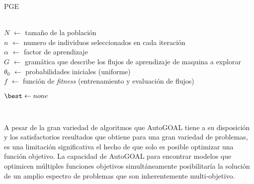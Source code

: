 \begin{algorithm}[htb!]
    \caption{PGE\label{algorithm:pge}}

    \\
    \quad $N$ $\leftarrow$ tamaño de la población \\
    \quad $n$ $\leftarrow$ numero de individuos seleccionados en cada iteración \\
    \quad $\alpha$ $\leftarrow$ factor de aprendizaje \\
    \quad $G$ $\leftarrow$ gramática que describe los flujos de aprendizaje de maquina a explorar \\
    \quad $\theta_0$ $\leftarrow$ probabilidades iniciales (uniforme) \\
    \quad $f$ $\leftarrow$ función de \emph{fitness} (entrenamiento y evaluación de flujos) \\
    
    \vspace{10pt}


    $\best \leftarrow none$

    \Return{\best} \\
\end{algorithm}

A pesar de la gran variedad de algoritmos que AutoGOAL tiene a su disposición y los satisfactorios resultados que obtiene para una gran variedad de problemas, es una limitación significativa el hecho de que solo es posible optimizar una función objetivo.
La capacidad de AutoGOAL para encontrar modelos que optimicen múltiples funciones objetivos simultáneamente posibilitaría la solución de un amplio espectro de problemas que son inherentemente multi-objetivo.


